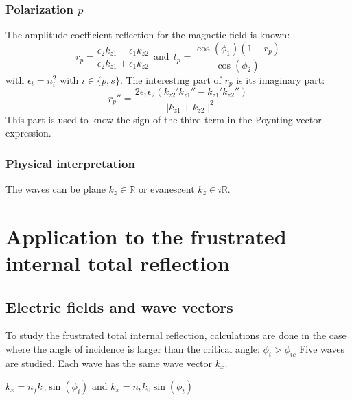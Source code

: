 \subsubsection{Polarization $p$}
The amplitude coefficient reflection for the magnetic field is known:
$$
r_p=\frac{\epsilon_2k_{z1}-\epsilon_1k_{z2}}{\epsilon_2k_{z1}+\epsilon_1k_{z2}}
 \ \ \text{and} \ \ t_p = \frac{\cos(\phi_1)(1-r_p)}{\cos(\phi_2)}$$
with $\epsilon_i=n_i^2$ with $i\in\{p,s\}$.
The interesting part of $r_p$ is its imaginary part:\\
\begin{equation*}
r_p'' = \frac{2\epsilon_1\epsilon_2(k_{z2}'k_{z1}''-k_{z1}'k_{z2}'')}{\mid k_{z1}+k_{z2}\mid^2}
\end{equation*}
This part is used to know the sign of the third term in the Poynting vector expression.
\subsubsection{Physical interpretation}
The waves can be plane $k_{z}\in \mathbb{R}$ or evanescent $k_{z}\in i\mathbb{R}$.


\section{Application to the frustrated internal total reflection}

\subsection{Electric fields and wave vectors}
To study the frustrated total internal reflection, calculations are done in the case where the angle of incidence is larger than the critical angle:
$\phi_i > \phi_{ic}$
Five waves are studied. Each wave has the same wave vector $k_x$.
\begin{center}
$k_x=n_fk_0\sin(\phi_i)$ and $k_x=n_bk_0\sin(\phi_t)$\\
\end{center}

